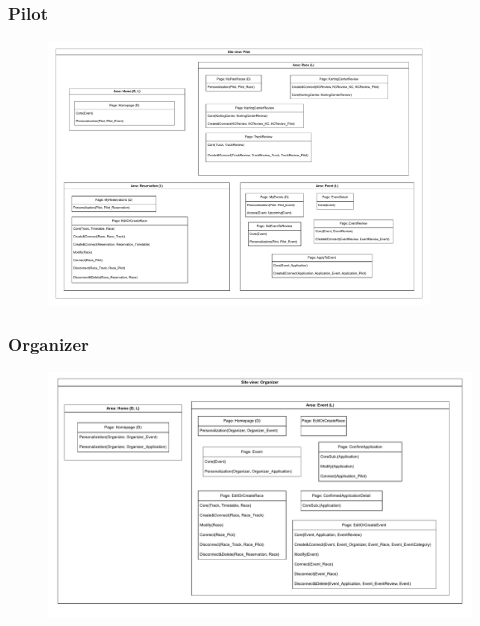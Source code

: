 \documentclass{beamer}
\begin{document}
\begin{frame}
    \frametitle{Pilot}
    \begin{figure}
        \centering
        \includegraphics[width=0.9\textwidth]{drawio/pilot-view.pdf}
    \end{figure}
\end{frame}

\begin{frame}
    \frametitle{Organizer}
    \begin{figure}
        \centering
        \includegraphics[width=1\textwidth]{drawio/organizer-view.pdf}
    \end{figure}
\end{frame}
\end{document}
